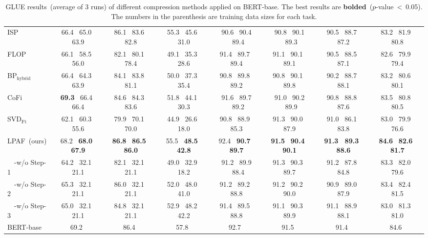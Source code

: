 \begin{table*}[t]
\begin{tabular}{l|ccccccc}
		ISP  &66.4~ 65.0~ 63.9 &86.1~ 83.6~ 82.8 &55.3~ 45.6~ 31.0   & 90.6~ 90.4 ~89.4          & 90.8~ 90.1 ~89.3          & 90.5~ 88.7~ 87.2          & 83.2 ~81.9~ 80.8                                                  \\
		FLOP &66.1~ 58.5~ 56.0 &82.1~ 80.1~ 78.4 &49.1~ 35.3~ 28.6   & 91.4~ 89.7~ 89.4          & 91.1~ 90.1~ 89.1          & 90.5~ 88.5~ 87.1          & 82.6 ~79.9~ 79.4                                                  \\
		BP$_{\text{hybrid}}$ &66.4~ 64.3~ 63.9&84.1~ 83.8~ 81.1 &50.0~ 37.3~ 35.4   & 90.8~ 89.8~ 89.2          & 90.8~ 90.1~ 89.8          & 90.2~ 88.7~ 88.1          & 83.2 ~80.6~ 80.1                                                  \\
		CoFi  &\textbf{69.3}~ 66.4~ 66.4 &84.6~ 84.3~ 83.6 &51.8~ 44.1~ 30.3   & 91.6~ 89.7 ~89.2          & 91.0~ 90.2 ~89.9          & 90.8~ 88.8~ 87.6          & 83.5 ~80.8~ 80.5                                                  \\
		\hline
		SVD$_{\text{Ft}}$  &62.1~ 60.3~ 55.6 &79.9~ 70.1~ 70.0&44.9~ 26.6~ 18.0    & 90.8 ~88.9~ 85.3         & 91.3 ~90.0~ 87.9          & 91.0 ~86.1~ 83.8          & 83.0~ 79.9~ 76.6         \\
		LPAF~(ours)  &68.2~ \textbf{68.0}~ \textbf{67.9} &\textbf{86.8}~ \textbf{86.5}~ \textbf{86.0} &55.5~ \textbf{48.5~ 42.8}     & 92.4~ \textbf{90.7~ 89.7} & \textbf{91.5}~ \textbf{90.4}~ \textbf{90.1} & \textbf{91.3~ 89.3~ 88.6} & \textbf{84.6}~ \textbf{82.6}~ \textbf{81.7}  \\
		~~-w/o Step-1   &64.2~ 32.1~ 21.1 &82.1~ 32.1~ 21.1 &49.0~ 32.9~ 18.2    &91.2~ 89.9 ~88.4 &91.3~ 90.3~ 89.7 &91.2~ 87.8~ 84.8 &83.3~ 82.0~ 79.6  \\
		~~-w/o Step-2  &65.3~ 32.1~ 21.1 &86.0~ 32.1~ 21.1   &52.0~ 48.0~ 41.0   &91.2~ 89.2~ 88.8 &91.2~ 90.2~ 90.0 &90.9~ 89.0~ 87.9 &83.4~ 82.4~ 81.5 \\
		~~-w/o Step-3   &65.0~ 32.1~ 21.1 &84.8~ 32.1~ 21.1 &52.9~ 48.2~ 42.2     &91.4~ 89.5~ 88.8 &91.1~ 90.3~ 89.9 &91.1~ 88.9~ 88.1 &83.0~ 81.3~ 81.0 \\
\midrule
		BERT-base  &~~69.2~~~ &~~86.4~~~ &~~57.8~~~    &~~92.7~~~           & ~~91.5~~~          & ~~91.4~~~         &~~84.6~~~         \\
				\bottomrule

	\end{tabular}
	\caption{GLUE results~(average of 3 runs) of different compression methods applied on BERT-base. The best results are \textbf{bolded}~($p$-value~<~0.05). The numbers in the parenthesis are training data sizes for each task.}
	\label{table:all}
\end{table*}



